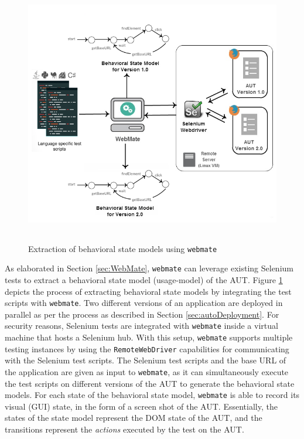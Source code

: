 \begin{figure}[h]
\makeatletter 
\makeatother
    \centering
  \includegraphics[width=5.5in,height=4.5in]{./Figures/WebMate_state_extraction.png}

\caption{Extraction of behavioral state models using \texttt{webmate}}
 \label{fig:webmateExtraction} 
\end{figure}

As elaborated in Section \ref{sec:WebMate}, \texttt{webmate} can leverage existing Selenium tests to extract a behavioral state model (usage-model) of the AUT. Figure \ref{fig:webmateExtraction} depicts the process of extracting behavioral state models by integrating the test scripts with \texttt{webmate}. Two different versions of an application are deployed in parallel as per the process as described in Section \ref{sec:autoDeployment}. For security reasons, Selenium tests are integrated with \texttt{webmate} inside a virtual machine that hosts a Selenium hub. With this setup, \texttt{webmate} supports multiple testing instances by using the \texttt{RemoteWebDriver} capabilities for communicating with the Selenium test scripts. The Selenium test scripts and the base URL of the application are given as input to \texttt{webmate}, as it can simultaneously execute the test scripts on different versions of the AUT to generate the behavioral state models. For each state of the behavioral state model, \texttt{webmate} is able to record its visual (GUI) state, in the form of a screen shot of the AUT. Essentially, the states of the state model represent the DOM state of the AUT, and the transitions represent the \textit{actions} executed by the test on the AUT.

